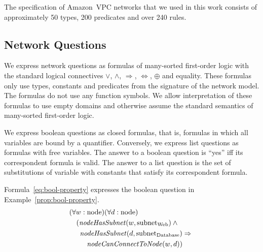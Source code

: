 The specification of Amazon~VPC networks that we used in this work consists of approximately 50 types, 200 predicates and over 240 rules.


\subsection{Network Questions}
\label{sect:aws/reachability/properties}

We express network questions as formulas of many-sorted first-order logic with the standard logical connectives $\vee$, $\wedge$, $\Rightarrow$, $\Leftrightarrow$, $\oplus$ and equality. These formulas only use types, constants and predicates from the signature of the network model. The formulas do not use any function symbols. We allow interpretation of these formulas to use empty domains and otherwise assume the standard semantics of many-sorted first-order logic.

We express boolean questions as closed formulas, that is, formulas in which all variables are bound by a quantifier. Conversely, we express list questions as formulas with free variables. The answer to a boolean question is ``yes'' iff its correspondent formula is valid. The answer to a list question is the set of substitutions of variable with constants that satisfy its correspondent formula.

Formula~\ref{eq:bool-property} expresses the boolean question in Example~\ref{prop:bool-property}.
\begin{equation}\label{eq:bool-property}
\begin{aligned}
&(\forall w:\mathrm{node})(\forall d:\mathrm{node})\\
&\quad(\mathit{nodeHasSubnet}(w, \mathrm{subnet}_\text{Web})\:\wedge\:\\
&\quad\,\,\,\mathit{nodeHasSubnet}(d, \mathrm{subnet}_\text{Database}) \Rightarrow~\\
&\quad\,\,\,\quad\mathit{nodeCanConnectToNode}(w,d))
\end{aligned}
\end{equation}

